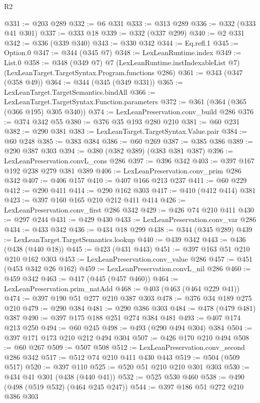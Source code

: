 \begin{lexlean}{R2}
\begin{coremodule}
@331 := @203 @289
@332 := @6 @331
@333 := @313 @289
@336 := @332 (@333 @41 @301)
@337 := @333 @18
@339 := @332 (@337 @299)
@340 := @2 @331
@342 := @336 (@339 @340)
@343 := @330 @342
@344 := Eq.refl.{1}
@345 := Option.{0}
@347 := @344 (@345 @7)
@348 := LexLeanRuntime.index
@349 := List.{0}
@358 := @348
    (@349 @7)
    @7
    (LexLeanRuntime.instIndexableList @7)
    (LexLeanTarget.TargetSyntax.Program.functions @286)
@361 := @343 (@347 (@358 @49))
@364 := @344 (@345 (@349 @331))
@365 := LexLeanTarget.TargetSemantics.bindAll
@366 := LexLeanTarget.TargetSyntax.Function.parameters
@372 := @361 (@364 (@365 (@366 @195) @305 @340))
@374 := LexLeanPreservation.conv_build @286
@376 := @374 @342 @55
@380 := @376 @35 @193 @280 @210
@381 := @60 @231
@382 := @290 @381
@383 := LexLeanTarget.TargetSyntax.Value.pair
@384 := @60 @248
@385 := @383 @384
@386 := @60 @269
@387 := @385 @386
@389 := @290 @387 @303
@394 := @380 (@382 @389) (@383 @381 @387)
@396 := LexLeanPreservation.convL_cons @286
@397 := @396 @342
@403 := @397 @167 @192 @238 @279 @381 @389
@406 := LexLeanPreservation.conv_prim @286 @342
@407 := @406 @157
@410 := @407 @166 @213 @237
@411 := @60 @229
@412 := @290 @411
@414 := @290 @162 @303
@417 := @410 (@412 @414) @381
@423 := @397 @160 @165 @210 @212 @411 @414
@426 := LexLeanPreservation.conv_first @286 @342
@429 := @426 @74 @210 @411
@430 := @297 @244
@431 := @429 @430
@433 := LexLeanPreservation.conv_var @286
@434 := @433 @342
@436 := @434 @18 @299
@438 := @344 (@345 @289)
@439 := LexLeanTarget.TargetSemantics.lookup
@440 := @439 @342
@443 := @436 (@438 (@440 @18))
@445 := @423 (@431 @443)
@451 := @397 @163 @51 @210 @210 @162 @303
@453 := LexLeanPreservation.conv_value @286
@457 := @451 (@453 @342 @26 @162)
@459 := LexLeanPreservation.convL_nil @286
@460 := @459 @342
@463 := @417 (@445 (@457 @460))
@464 := LexLeanPreservation.prim_natAdd
@468 := @403 (@463 (@464 @229 @41))
@474 := @397 @190 @51 @277 @210 @387 @303
@478 := @376 @34 @189 @275 @210
@479 := @290 @384
@481 := @290 @386 @303
@484 := @478 (@479 @481) @387
@490 := @397 @175 @188 @251 @274 @384 @481
@493 := @407 @174 @213 @250
@494 := @60 @245
@498 := @493 (@290 @494 @304) @384
@504 := @397 @171 @173 @210 @212 @494 @304
@507 := @426 @170 @210 @494
@508 := @60 @267
@509 := @507 @508
@512 := LexLeanPreservation.conv_second @286 @342
@517 := @512 @74 @210 @411 @430 @443
@519 := @504 (@509 @517)
@520 := @397 @110
@525 := @520 @51 @210 @210 @301 @303
@530 := @434 @41 @301 (@438 (@440 @41))
@532 := @525 @530 @460
@538 := @490 (@498 (@519 @532) (@464 @245 @247))
@544 := @397 @186 @51 @272 @210 @386 @303

\end{coremodule}
\end{lexlean}
